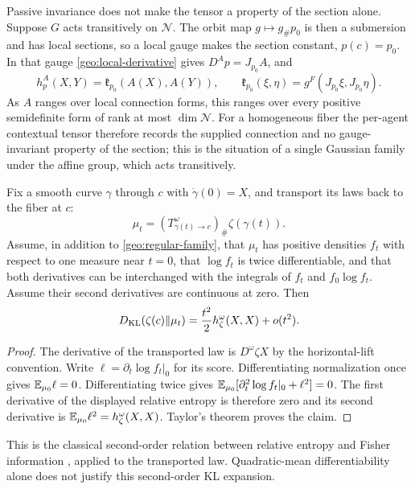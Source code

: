 Passive invariance does not make the tensor a property of the section alone. Suppose $G$ acts transitively on $\mathcal N$. The orbit map $g\mapsto g_\#p_0$ is then a submersion and has local sections, so a local gauge makes the section constant, $p(c)=p_0$. In that gauge \cref{geo:local-derivative} gives $D^Ap=J_{p_0}A$, and
\begin{equation}
h^A_p(X,Y)=\mathfrak k_{p_0}(A(X),A(Y)),
\qquad
\mathfrak k_{p_0}(\xi,\eta)=g^F(J_{p_0}\xi,J_{p_0}\eta).
\label{geo:transitive-pullback}
\end{equation}
As $A$ ranges over local connection forms, this ranges over every positive semidefinite form of rank at most $\dim\mathcal N$. For a homogeneous fiber the per-agent contextual tensor therefore records the supplied connection and no gauge-invariant property of the section; this is the situation of a single Gaussian family under the affine group, which acts transitively.

Fix a smooth curve $\gamma$ through $c$ with $\dot\gamma(0)=X$, and transport its laws back to the fiber at $c$:
\begin{equation}
\mu_t=(T^\omega_{\gamma(t)\to c})_\#\zeta(\gamma(t)).
\end{equation}
Assume, in addition to \cref{geo:regular-family}, that $\mu_t$ has positive densities $f_t$ with respect to one measure near $t=0$, that $\log f_t$ is twice differentiable, and that both derivatives can be interchanged with the integrals of $f_t$ and $f_0\log f_t$. Assume their second derivatives are continuous at zero. Then
\begin{equation}
D_{\mathrm{KL}}(\zeta(c)\Vert\mu_t)
=\frac{t^2}{2}h^\omega_\zeta(X,X)+o(t^2).
\label{geo:kl-pullback}
\end{equation}
\begin{proof}
The derivative of the transported law is $D^\omega\zeta X$ by the horizontal-lift convention. Write $\ell=\partial_t\log f_t|_0$ for its score. Differentiating normalization once gives $\mathbb E_{\mu_0}\ell=0$. Differentiating twice gives
$\mathbb E_{\mu_0}[\partial_t^2\log f_t|_0+\ell^2]=0$. The first derivative of the displayed relative entropy is therefore zero and its second derivative is $\mathbb E_{\mu_0}\ell^2=h^\omega_\zeta(X,X)$. Taylor's theorem proves the claim.
\end{proof}

This is the classical second-order relation between relative entropy and Fisher information \citep{Kullback1959}, applied to the transported law. Quadratic-mean differentiability alone does not justify this second-order KL expansion.

